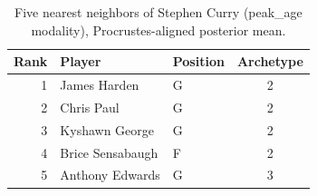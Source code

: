 \begin{table}[htbp]
  \centering\small
  \begin{tabular}{rllc}
    \toprule
    Rank & Player & Position & Archetype \\
    \midrule
    1 & James Harden & G & 2 \\
    2 & Chris Paul & G & 2 \\
    3 & Kyshawn George & G & 2 \\
    4 & Brice Sensabaugh & F & 2 \\
    5 & Anthony Edwards & G & 3 \\
    \bottomrule
  \end{tabular}
  \caption{Five nearest neighbors of Stephen Curry (peak_age modality), Procrustes-aligned posterior mean.}
  \label{tab:Stephen_Curry_neighbors_peak_age}
\end{table}

